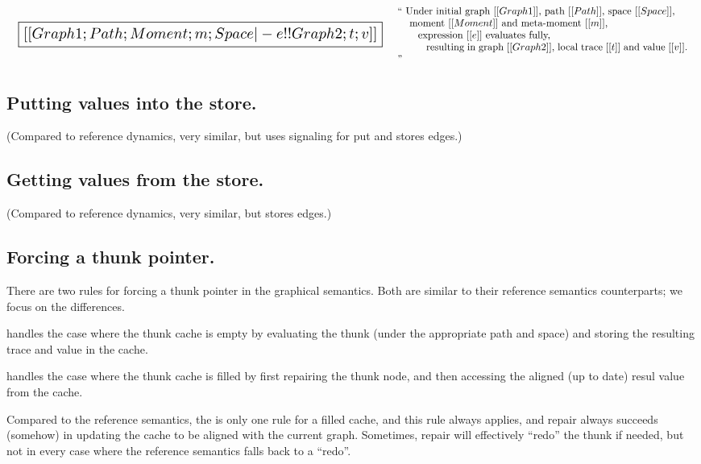 \documentclass[11pt]{article}
\begin{document}
\[
\begin{array}{lc}
  {\scalebox{1.5}{
  \boxed{[[Graph1; Path; Moment; m; Space |- e !! Graph2; t; v]]}}}
&
\begin{array}{p{4in}}
  ``
  Under initial graph~$[[Graph1]]$,
  path~$[[Path]]$,
  space~$[[Space]]$,\\
  \hspace{3mm}~moment~$[[Moment]]$ and meta-moment~$[[m]]$,\\
  \hspace{6mm}~expression~$[[e]]$ evaluates fully,\\
  \hspace{9mm}~resulting in graph~$[[Graph2]]$, local trace~$[[t]]$ and value~$[[v]]$.
  ''
\end{array}
\end{array}
\]

\subsection{Putting values into the store.}

(Compared to reference dynamics, very similar, but uses signaling for put and stores edges.)

\subsection{Getting values from the store.}

(Compared to reference dynamics, very similar, but stores edges.)

\subsection{Forcing a thunk pointer.}

There are two rules for forcing a thunk pointer in the graphical semantics.
%
Both are similar to their reference semantics counterparts; we focus on the differences.

 handles the case where the thunk cache is empty
by evaluating the thunk (under the appropriate path and space) and
storing the resulting trace and value in the cache.

 handles the case where the thunk cache is filled
by first repairing the thunk node, and then accessing the aligned (up
to date) resul value from the cache.

Compared to the reference semantics, the is only one rule for a filled
cache, and this rule always applies, and repair always succeeds
(somehow) in updating the cache to be aligned with the current graph.
%
Sometimes, repair will effectively ``redo'' the thunk if needed, but
not in every case where the reference semantics falls back to a
``redo''.
\end{document}
